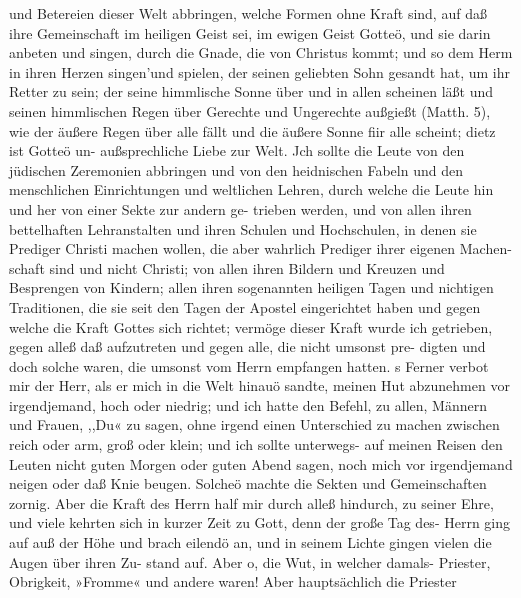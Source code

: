 und Betereien dieser Welt abbringen, welche Formen ohne Kraft
sind, auf daß ihre Gemeinschaft im heiligen Geist sei, im ewigen
Geist Gotteö, und sie darin anbeten und singen, durch die Gnade,
die von Christus kommt; und so dem Herm in ihren Herzen
singen’und spielen, der seinen geliebten Sohn gesandt hat, um
ihr Retter zu sein; der seine himmlische Sonne über und in allen
scheinen läßt und seinen himmlischen Regen über Gerechte und
Ungerechte außgießt (Matth. 5), wie der äußere Regen über alle
fällt und die äußere Sonne fiir alle scheint; dietz ist Gotteö un-
außsprechliche Liebe zur Welt. Jch sollte die Leute von den
jüdischen Zeremonien abbringen und von den heidnischen Fabeln
und den menschlichen Einrichtungen und weltlichen Lehren, durch
welche die Leute hin und her von einer Sekte zur andern ge-
trieben werden, und von allen ihren bettelhaften Lehranstalten
und ihren Schulen und Hochschulen, in denen sie Prediger Christi
machen wollen, die aber wahrlich Prediger ihrer eigenen Machen-
schaft sind und nicht Christi; von allen ihren Bildern und Kreuzen
und Besprengen von Kindern; allen ihren sogenannten heiligen
Tagen und nichtigen Traditionen, die sie seit den Tagen der
Apostel eingerichtet haben und gegen welche die Kraft Gottes
sich richtet; vermöge dieser Kraft wurde ich getrieben, gegen
alleß daß aufzutreten und gegen alle, die nicht umsonst pre-
digten und doch solche waren, die umsonst vom Herrn empfangen
hatten. s
Ferner verbot mir der Herr, als er mich in die Welt hinauö
sandte, meinen Hut abzunehmen vor irgendjemand, hoch oder
niedrig; und ich hatte den Befehl, zu allen, Männern und Frauen,
,,Du« zu sagen, ohne irgend einen Unterschied zu machen zwischen
reich oder arm, groß oder klein; und ich sollte unterwegs- auf
meinen Reisen den Leuten nicht guten Morgen oder guten Abend
sagen, noch mich vor irgendjemand neigen oder daß Knie beugen.
Solcheö machte die Sekten und Gemeinschaften zornig. Aber die
Kraft des Herrn half mir durch alleß hindurch, zu seiner Ehre,
und viele kehrten sich in kurzer Zeit zu Gott, denn der große
Tag des- Herrn ging auf auß der Höhe und brach eilendö an,
und in seinem Lichte gingen vielen die Augen über ihren Zu-
stand auf.
Aber o, die Wut, in welcher damals- Priester, Obrigkeit,
»Fromme« und andere waren! Aber hauptsächlich die Priester


